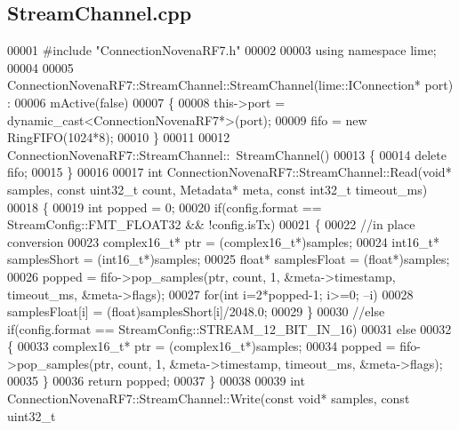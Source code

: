 \subsection{Stream\+Channel.\+cpp}
\label{StreamChannel_8cpp_source}

\begin{DoxyCode}
00001 \textcolor{preprocessor}{#include "ConnectionNovenaRF7.h"}
00002 
00003 \textcolor{keyword}{using namespace }lime;
00004 
00005 ConnectionNovenaRF7::StreamChannel::StreamChannel(lime::IConnection* port) :
00006     mActive(false)
00007 \{
00008     this->port = \textcolor{keyword}{dynamic\_cast<}ConnectionNovenaRF7*\textcolor{keyword}{>}(port);
00009     fifo = \textcolor{keyword}{new} RingFIFO(1024*8);
00010 \}
00011 
00012 ConnectionNovenaRF7::StreamChannel::~StreamChannel()
00013 \{
00014     \textcolor{keyword}{delete} fifo;
00015 \}
00016 
00017 \textcolor{keywordtype}{int} ConnectionNovenaRF7::StreamChannel::Read(\textcolor{keywordtype}{void}* samples, \textcolor{keyword}{const} uint32\_t count, Metadata* 
      meta, \textcolor{keyword}{const} int32\_t timeout_ms)
00018 \{
00019     \textcolor{keywordtype}{int} popped = 0;
00020     \textcolor{keywordflow}{if}(config.format == StreamConfig::FMT_FLOAT32 && !config.isTx)
00021     \{
00022         \textcolor{comment}{//in place conversion}
00023         complex16_t* ptr = (complex16_t*)samples;
00024         int16\_t* samplesShort = (int16\_t*)samples;
00025         \textcolor{keywordtype}{float}* samplesFloat = (\textcolor{keywordtype}{float}*)samples;
00026         popped = fifo->pop_samples(ptr, count, 1, &meta->timestamp, timeout\_ms, &meta->flags);
00027         \textcolor{keywordflow}{for}(\textcolor{keywordtype}{int} i=2*popped-1; i>=0; --i)
00028             samplesFloat[i] = (\textcolor{keywordtype}{float})samplesShort[i]/2048.0;
00029     \}
00030     \textcolor{comment}{//else if(config.format == StreamConfig::STREAM\_12\_BIT\_IN\_16)}
00031     \textcolor{keywordflow}{else}
00032     \{
00033         complex16_t* ptr = (complex16_t*)samples;
00034         popped = fifo->pop_samples(ptr, count, 1, &meta->timestamp, timeout\_ms, &meta->flags);
00035     \}
00036     \textcolor{keywordflow}{return} popped;
00037 \}
00038 
00039 \textcolor{keywordtype}{int} ConnectionNovenaRF7::StreamChannel::Write(\textcolor{keyword}{const} \textcolor{keywordtype}{void}* samples, \textcolor{keyword}{const} uint32\_t 

\end{DoxyCode}
